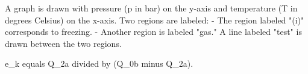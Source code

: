 A graph is drawn with pressure (p in bar) on the y-axis and temperature (T in degrees Celsius) on the x-axis. Two regions are labeled:  
- The region labeled "(i)" corresponds to freezing.  
- Another region is labeled "gas."  
A line labeled "test" is drawn between the two regions.

e_k equals Q_2a divided by (Q_0b minus Q_2a).